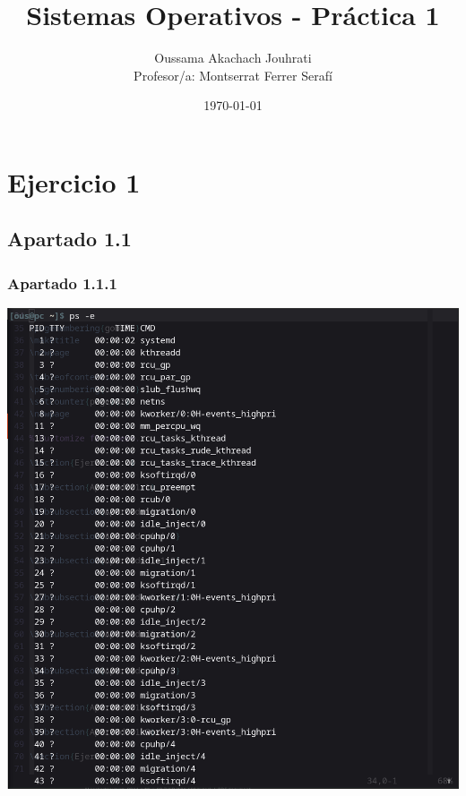 \documentclass[spanish]{article}
\title{Sistemas Operativos - Práctica 1}
\author{Oussama Akachach Jouhrati\\[0.5cm]{\small Profesor/a: Montserrat Ferrer
Serafí}}
\date{\today}
\begin{document}
\maketitle
\newpage

\tableofcontents
{}
\setcounter{page}{2}
\newpage


\section{Ejercicio 1}

\subsection{Apartado 1.1}

\subsubsection{Apartado 1.1.1}

\begin{center}
\includegraphics[scale=.3]{../img/1.png}
\end{center}

\newpage
\end{document}
